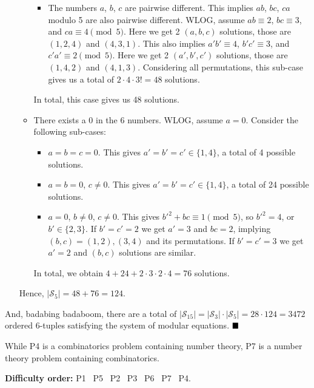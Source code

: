 \documentclass[11pt]{article}
\newenvironment{solution}[1][Solution]{%
  \proof[\normalfont \faPenNib \hspace{0.2cm} \ttfamily \scshape \large #1]%
}{\(\hfill \blacksquare\){\parfillskip0pt\par}}
\theoremstyle{definition}
\begin{document}
\begin{solution}
\begin{enumerate}
\begin{itemize}
\begin{itemize}
                        \item The numbers \(a\), \(b\), \(c\) are pairwise different. This implies \(ab\), \(bc\), \(ca\) modulo 5 are also pairwise different. WLOG, assume \(ab \equiv 2\), \(bc \equiv 3\), and \(ca \equiv 4 \pmod{5}\). Here we get 2 \((a,b,c)\) solutions, those are \((1,2,4)\) and \((4,3,1)\). This also implies \(a'b' \equiv 4\), \(b'c' \equiv 3\), and \(c'a' \equiv 2 \pmod5\). Here we get 2 \((a',b',c')\) solutions, those are \((1,4,2)\) and \((4,1,3)\). Considering all permutations, this sub-case gives us a total of \(2 \cdot 4 \cdot 3! = 48\) solutions.
                    \end{itemize}

                    In total, this case gives us 48 solutions.

                    \item There exists a 0 in the 6 numbers. WLOG, assume \(a = 0\). Consider the following sub-cases:

                    \begin{itemize}
                        \item \(a = b = c = 0\). This gives \(a' = b' = c' \in \{1,4\}\), a total of 4 possible solutions.
                        \item \(a = b = 0\), \(c \neq 0\). This gives \(a' = b' = c' \in \{1,4\}\), a total of 24 possible solutions.
                        \item \(a = 0\), \(b \neq 0\), \(c \neq 0\). This gives \(b'^2 + bc \equiv 1 \pmod5\), so \(b'^2 = 4\), or \(b' \in \{2,3\}\). If \(b' = c' = 2\) we get \(a' = 3\) and \(bc = 2\), implying \((b,c) = (1,2), (3,4)\) and its permutations. If \(b' = c' = 3\) we get \(a' = 2\) and \((b,c)\) solutions are similar.
                    \end{itemize}

                    In total, we obtain \(4 + 24 + 2 \cdot 3 \cdot 2 \cdot 4 = 76\) solutions.
                \end{itemize}

                Hence, \(\left|\mathcal{S}_{5}\right| = 48 + 76 = 124\).
            \end{enumerate}

            And, badabing badaboom, there are a total of \(\left|\mathcal{S}_{15}\right| = \left|\mathcal{S}_{3}\right| \cdot\left|\mathcal{S}_{5}\right| = 28 \cdot 124 = 3472\) ordered 6-tuples satisfying the system of modular equations.
        \end{solution}

        \begin{remark}
            While P4 is a combinatorics problem containing number theory, P7 is a number theory problem containing combinatorics.
        \end{remark}

        \textbf{Difficulty order:} P1 \textrightarrow \ P5 \textrightarrow \ P2 \textrightarrow \ P3 \textrightarrow \ P6 \textrightarrow \ P7 \textrightarrow \ P4.
\end{document}
